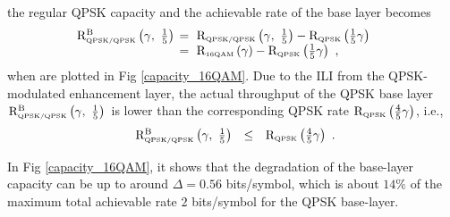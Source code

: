 \documentclass[10pt,fleqn, twocolumn]{IEEEtran}
\begin{document}
the regular QPSK capacity and the achievable rate of the base
layer becomes
\begin{equation}\hspace{-0.2in}
\begin{array}{rl}
{\rm R}_{\mbox{\tiny QPSK/QPSK}}^{\rm B}\left(\gamma,\
\frac{1}{5}\right)&\hspace{-0.08in}=\ {\rm R}_{\mbox{\tiny
QPSK/QPSK}}\left(\gamma,\
\frac{1}{5}\right)-{\rm R}_{\mbox{\tiny QPSK}} \left(\frac{1}{5}\gamma\right)\\
&\hspace{-0.08in}=\ {\rm R}_{\mbox{\tiny
16QAM}}\left(\gamma\right)-{\rm R}_{\mbox{\tiny
QPSK}}\left(\frac{1}{5}\gamma\right)\ ,
\end{array}\label{R_16QAM_B1}
\end{equation}
\noindent when are plotted in Fig \ref{capacity_16QAM}. Due to the
ILI from the QPSK-modulated enhancement layer, the actual
throughput of the QPSK base layer ${\rm R}_{\mbox{\tiny
QPSK/QPSK}}^{\rm B}\left(\gamma,\ \frac{1}{5} \right)$ is lower
than the corresponding QPSK rate ${\rm R}_{\mbox{\tiny
QPSK}}\left(\frac{4}{5}\gamma\right)$, i.e.,
\begin{equation}
\begin{array}{rcl}
{\rm R}_{\mbox{\tiny QPSK/QPSK}}^{\rm B}\left(\gamma,\ \frac{1}{5}
\right)&\leq&{\rm R}_{\mbox{\tiny QPSK}}
\left(\frac{4}{5}\gamma\right)
\end{array}.\label{R_16QAM_B2}
\end{equation}
\begin{figure}
\end{figure}
\noindent In Fig \ref{capacity_16QAM}, it shows that the
degradation of the base-layer capacity can be up to around
$\Delta=0.56$ bits/symbol, which is about $14\%$ of the maximum
total achievable rate $2$ bits/symbol for the QPSK base-layer.
\end{document}

